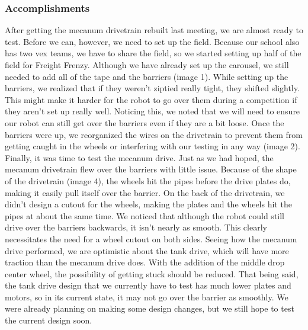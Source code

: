 \subsubsection*{Accomplishments}
After getting the mecanum drivetrain rebuilt last meeting, we are almost ready to test. Before we can, however, we need to set up the field. Because our school also has two vex teams, we have to share the field, so we started setting up half of the field for Freight Frenzy. Although we have already set up the carousel, we still needed to add all of the tape and the barriers (image 1). While setting up the barriers, we realized that if they weren’t ziptied really tight, they shifted slightly. This might make it harder for the robot to go over  them during a competition if they aren’t set up really well. Noticing this, we noted that we will need to ensure our robot can still get over the barriers even if they are a bit loose. Once the barriers were up, we reorganized the wires on the drivetrain to prevent them from getting caught in the wheels or interfering with our testing in any way (image 2). 
Finally, it was time to test the mecanum drive. Just as we had hoped, the mecanum drivetrain flew over the  barriers with little issue. Because of the shape of the drivetrain (image 4), the wheels hit the pipes before the drive plates do, making it easily pull itself over the barrier. On the back of the drivetrain, we didn’t design a cutout for the wheels, making the plates and the wheels hit the  pipes at about the same time. We noticed that although the robot could still drive over the barriers backwards, it isn’t nearly as smooth. This clearly necessitates the need for a wheel cutout on both sides. Seeing how the mecanum drive performed, we are optimistic about the tank drive, which will have more traction than the mecanum drive does. With the addition of the middle drop center wheel, the possibility of getting stuck should be reduced. That being said, the tank drive design that we currently have to test has much lower plates and motors, so in its current state, it may not go over the barrier as smoothly. We were already planning on making some design changes, but we still hope to test the current design soon.

 

